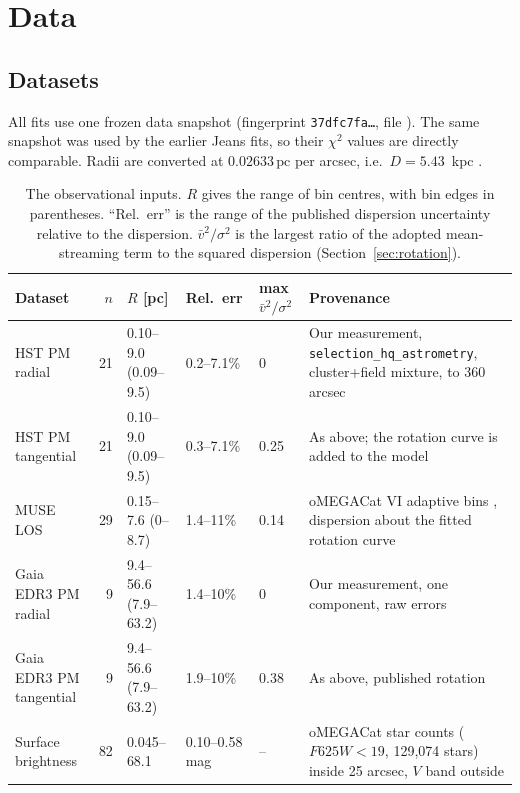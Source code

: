 \documentclass[11pt,a4paper]{article}
\newcommand{\pc}{\ensuremath{\,\mathrm{pc}}\xspace}
\begin{document}
\section{Data}
\label{sec:data}

\subsection{Datasets}

All fits use one frozen data snapshot (fingerprint
\texttt{37dfc7fa\ldots}, file ).
The same snapshot was used by the earlier Jeans fits, so their $\chi^2$ values
are directly comparable. Radii are converted at $0.02633\pc$ per arcsec,
i.e.\ $D=5.43$~kpc
\citep[the project's adopted distance, from][]{2021MNRAS.505.5957B}.

\begin{table}[htbp]
\centering\footnotesize
\caption{The observational inputs. $R$ gives the range of bin centres, with
bin edges in parentheses. ``Rel.\ err'' is the range of the published
dispersion uncertainty relative to the dispersion. $\bar v^2/\sigma^2$ is the
largest ratio of the adopted mean-streaming term to the squared dispersion
(Section~\ref{sec:rotation}).}
\label{tab:data}
\begin{tabularx}{\linewidth}{lrlllY}
\toprule
Dataset & $n$ & $R$ [pc] & Rel.\ err & max $\bar v^2/\sigma^2$ & Provenance\\
\midrule
HST PM radial & 21 & 0.10--9.0 (0.09--9.5) & 0.2--7.1\% & 0 & Our measurement, \texttt{selection\_hq\_astrometry}, cluster+field mixture, to 360 arcsec\\
HST PM tangential & 21 & 0.10--9.0 (0.09--9.5) & 0.3--7.1\% & 0.25 & As above; the \citet{2021MNRAS.505.5978V} rotation curve is added to the model\\
MUSE LOS & 29 & 0.15--7.6 (0--8.7) & 1.4--11\% & 0.14 & oMEGACat VI adaptive bins \citep{2025ApJ...983...95H}, dispersion about the fitted rotation curve\\
Gaia EDR3 PM radial & 9 & 9.4--56.6 (7.9--63.2) & 1.4--10\% & 0 & Our measurement, one component, raw errors\\
Gaia EDR3 PM tangential & 9 & 9.4--56.6 (7.9--63.2) & 1.9--10\% & 0.38 & As above, published rotation\\
Surface brightness & 82 & 0.045--68.1 & 0.10--0.58 mag & -- & oMEGACat star counts ($F625W<19$, 129{,}074 stars) inside 25 arcsec, \citet{1995AJ....109..218T} $V$ band outside\\
\bottomrule
\end{tabularx}
\end{table}
\end{document}
